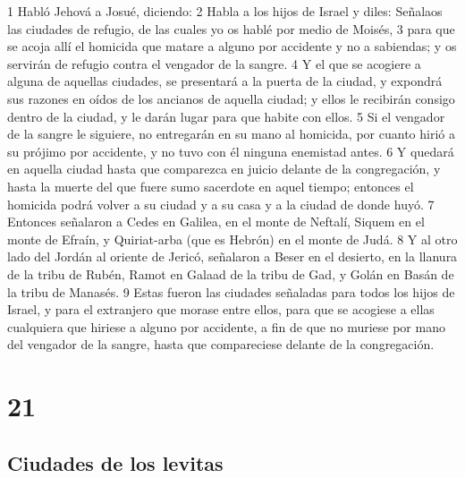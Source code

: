 1 Habló Jehová a Josué, diciendo:
2 Habla a los hijos de Israel y diles: Señalaos las ciudades de refugio, de las cuales yo os hablé por medio de Moisés, 
3 para que se acoja allí el homicida que matare a alguno por accidente y no a sabiendas; y os servirán de refugio contra el vengador de la sangre.
4 Y el que se acogiere a alguna de aquellas ciudades, se presentará a la puerta de la ciudad, y expondrá sus razones en oídos de los ancianos de aquella ciudad; y ellos le recibirán consigo dentro de la ciudad, y le darán lugar para que habite con ellos.
5 Si el vengador de la sangre le siguiere, no entregarán en su mano al homicida, por cuanto hirió a su prójimo por accidente, y no tuvo con él ninguna enemistad antes.
6 Y quedará en aquella ciudad hasta que comparezca en juicio delante de la congregación, y hasta la muerte del que fuere sumo sacerdote en aquel tiempo; entonces el homicida podrá volver a su ciudad y a su casa y a la ciudad de donde huyó.
7 Entonces señalaron a Cedes en Galilea, en el monte de Neftalí, Siquem en el monte de Efraín, y Quiriat-arba (que es Hebrón) en el monte de Judá.
8 Y al otro lado del Jordán al oriente de Jericó, señalaron a Beser en el desierto, en la llanura de la tribu de Rubén, Ramot en Galaad de la tribu de Gad, y Golán en Basán de la tribu de Manasés.
9 Estas fueron las ciudades señaladas para todos los hijos de Israel, y para el extranjero que morase entre ellos, para que se acogiese a ellas cualquiera que hiriese a alguno por accidente, a fin de que no muriese por mano del vengador de la sangre, hasta que compareciese delante de la congregación.

\chapter{21}

\section*{Ciudades de los levitas }

